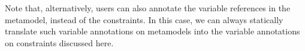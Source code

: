
Note that, alternatively, users can also annotate the variable references in the metamodel, instead of the constraints. In this case, we can always statically translate such variable annotations on metamodels into the variable annotations on constraints discussed here.










